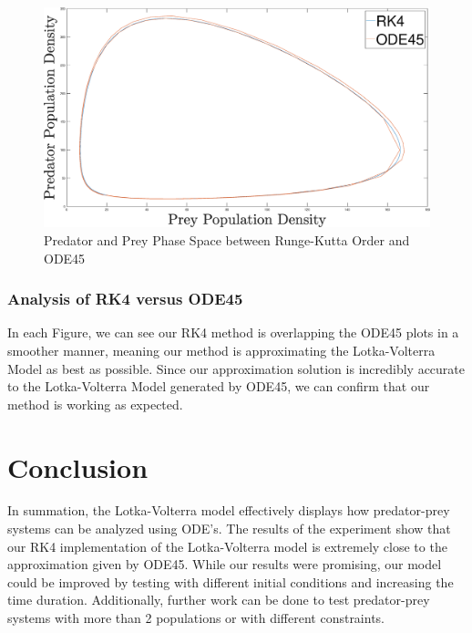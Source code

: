 \documentclass[12pt]{article}
\begin{document}
\begin{figure}[H]
\begin{center}
 		\includegraphics[width = 1\textwidth]{Images/Phase.eps}
 		\caption{Predator and Prey Phase Space between Runge-Kutta  Order and ODE45}
 		\label{fig:2}
    \end{center}
\end{figure}
\subsubsection{Analysis of RK4 versus ODE45}
In each Figure, we can see our RK4 method is overlapping the ODE45 plots in a smoother manner, meaning our method is approximating the Lotka-Volterra Model as best as possible.
Since our approximation solution is incredibly accurate to the Lotka-Volterra Model generated by ODE45, we can confirm that our method is working as expected.

\begin{figure}[H]
    \centering
\end{figure}


\section{Conclusion}
In summation, the Lotka-Volterra model effectively displays how predator-prey systems can be analyzed using ODE's. The results of the experiment show that our RK4 implementation of the Lotka-Volterra model is extremely close to the approximation given by ODE45. While our results were promising, our model could be improved by testing with different initial conditions and increasing the time duration. Additionally, further work can be done to test predator-prey systems with more than 2 populations or with different constraints.
\newpage


\end{document}
